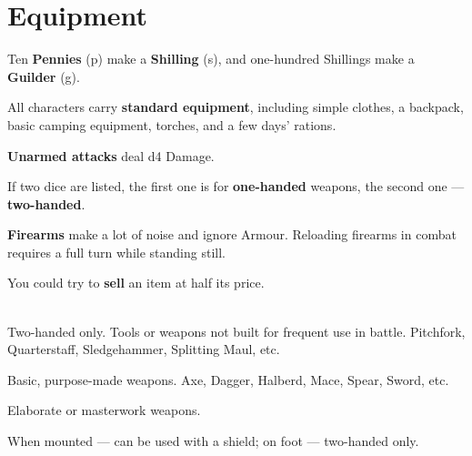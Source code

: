 \documentclass[itdr]{subfiles}
\begin{document}
\vfill


\vfill
\clearpage


\section{Equipment}

Ten \textbf{Pennies} (p) make a \textbf{Shilling} (s), and one-hundred Shillings make a \textbf{Guilder} (g).

\vfill

All characters carry \textbf{standard equipment}, including simple clothes, a backpack, basic camping equipment, torches, and a few days' rations.

\vfill

\textbf{Unarmed attacks} deal d4 Damage.

\vfill

If two dice are listed, the first one is for \textbf{one-handed} weapons, the second one --- \textbf{two-handed}.

\vfill

\textbf{Firearms} make a lot of noise and ignore Armour. Reloading firearms in combat requires a full turn while standing still.

\vfill

You could try to \textbf{sell} an item at half its price.

\vfill


\\Two-handed only. Tools or weapons not built for frequent use in battle. Pitchfork, Quarterstaff, Sledgehammer, Splitting Maul, etc.

 Basic, purpose-made weapons. Axe, Dagger, Halberd, Mace, Spear, Sword, etc.

 Elaborate or masterwork weapons.

 When mounted --- can be used with a shield; on foot --- two-handed only.

\vfill
\end{document}
